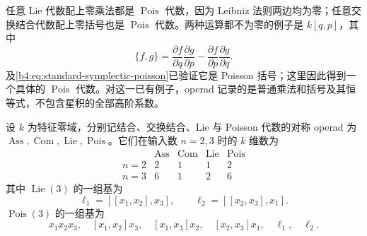 \ProseParagraphBreak
任意 Lie 代数配上零乘法都是 \(\operatorname{Pois}\) 代数，因为 Leibniz 法则两边均为零；任意交换结合代数配上零括号也是 \(\operatorname{Pois}\) 代数。两种运算都不为零的例子是 \(k[q,p]\)，其中
\[
	\{f,g\}=\frac{\partial f}{\partial q}\frac{\partial g}{\partial p}
	-\frac{\partial f}{\partial p}\frac{\partial g}{\partial q}.
\]
及\eqref{b4:eq:standard-symplectic-poisson}已验证它是 Poisson 括号；这里因此得到一个具体的 \(\operatorname{Pois}\) 代数。对这一已有例子，operad 记录的是普通乘法和括号及其恒等式，不包含星积的全部高阶系数。

\begin{proposition}\label{b4:prop:operad-low-arities}
	设 \(k\) 为特征零域，分别记结合、交换结合、Lie 与 Poisson 代数的对称 operad 为 \(\operatorname{Ass},\operatorname{Com},\operatorname{Lie},\operatorname{Pois}\)。它们在输入数 \(n=2,3\) 时的 \(k\) 维数为
	\[
		\begin{array}{c|rrrr}
			&\operatorname{Ass}&\operatorname{Com}&\operatorname{Lie}&\operatorname{Pois}\\\hline
			n=2&2&1&1&2\\
			n=3&6&1&2&6
		\end{array}
	\]
	其中 \(\operatorname{Lie}(3)\) 的一组基为
	\[
		\ell_1=[[x_1,x_2],x_3],\qquad
		\ell_2=[[x_2,x_3],x_1].
	\]
	\(\operatorname{Pois}(3)\) 的一组基为
	\[
		x_1x_2x_3,\quad [x_1,x_2]x_3,\quad [x_1,x_3]x_2,
		\quad [x_2,x_3]x_1,\quad \ell_1,\quad\ell_2.
	\]
\end{proposition}
